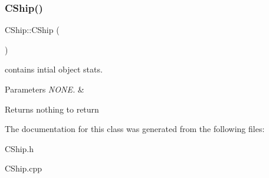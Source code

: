 \subsubsection{\texorpdfstring{C\+Ship()}{CShip()}}
{\footnotesize\ttfamily C\+Ship\+::\+C\+Ship (\begin{DoxyParamCaption}{ }\end{DoxyParamCaption})}



contains intial object stats. 


\begin{DoxyParams}{Parameters}
{\em N\+O\+N\+E.} & \\
\hline
\end{DoxyParams}
\begin{DoxyReturn}{Returns}
nothing to return 
\end{DoxyReturn}


The documentation for this class was generated from the following files\+:\begin{DoxyCompactItemize}
\item 
C\+Ship.\+h\item 
C\+Ship.\+cpp\end{DoxyCompactItemize}
